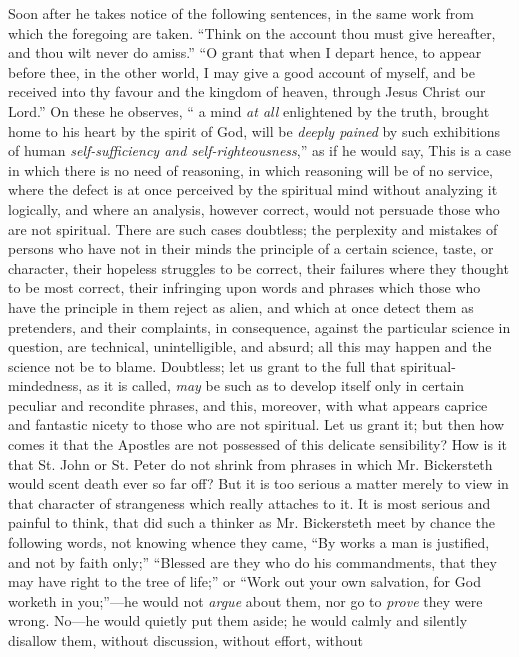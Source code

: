 Soon after he takes notice of the following
sentences, in the same work from which the foregoing are taken. ``Think
on the account thou must give hereafter, and thou wilt never do amiss.'' ``O
grant that when I depart hence, to appear before thee, in the other
world, I may give a good account of myself, and be received into thy
favour and the kingdom of heaven, through Jesus Christ our Lord.'' On
these he observes, `` a mind \emph{at all} enlightened by the truth,
brought home to his heart by the spirit of God, will be \emph{deeply pained}
by such exhibitions of human \emph{self-sufficiency and self-righteousness},''
as if he would say, This is a case in which there is no need of
reasoning, in which reasoning will be of no service, where the defect is
at once perceived by the spiritual mind without analyzing it logically,
and where an analysis, however correct, would not persuade those who are
not spiritual. There are such cases doubtless; the perplexity and
mistakes of persons who have not in their minds the principle of a
certain science, taste, or character, their hopeless struggles to be
correct, their failures where they thought to be most correct, their
infringing upon words and phrases which those who have the principle in
them reject as alien, and which at once detect them as pretenders, and
their complaints, in consequence, against the particular science in
question, are technical, unintelligible, and absurd; all this may happen
and the science not be to blame. Doubtless; let us grant to the full
that spiritual-mindedness, as it is called, \emph{may} be such as to
develop itself only in certain peculiar and recondite phrases, and this,
moreover, with what appears caprice and fantastic nicety to those who
are not spiritual. Let us grant it; but then how comes it that the
Apostles are not possessed of this delicate sensibility? How is it that
St. John or St. Peter do not shrink from phrases in which Mr.
Bickersteth would scent death ever so far off? But it is too serious a
matter merely to view in that character of strangeness which really
attaches to it. It is most serious and painful to think, that did such a
thinker as Mr. Bickersteth meet by chance the following words, not
knowing whence they came, ``By works a man is justified, and not by faith
only;'' ``Blessed are they who do his commandments, that they may have
right to the tree of life;'' or ``Work out your own salvation, for God
worketh in you;''—he would not \emph{argue} about them, nor go to \emph{prove}
they were wrong. No—he would quietly put them aside; he would calmly
and silently disallow them, without discussion, without effort, without

